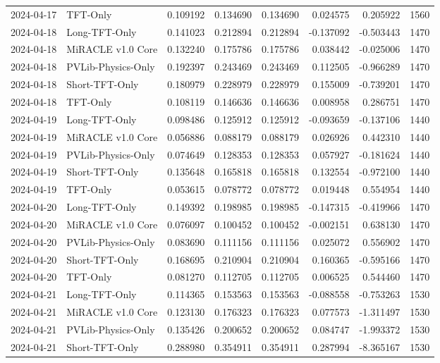 \begin{tabular}{llrrrrrr}
2024-04-17 & TFT-Only & 0.109192 & 0.134690 & 0.134690 & 0.024575 & 0.205922 & 1560 \\
2024-04-18 & Long-TFT-Only & 0.141023 & 0.212894 & 0.212894 & -0.137092 & -0.503443 & 1470 \\
2024-04-18 & MiRACLE v1.0 Core & 0.132240 & 0.175786 & 0.175786 & 0.038442 & -0.025006 & 1470 \\
2024-04-18 & PVLib-Physics-Only & 0.192397 & 0.243469 & 0.243469 & 0.112505 & -0.966289 & 1470 \\
2024-04-18 & Short-TFT-Only & 0.180979 & 0.228979 & 0.228979 & 0.155009 & -0.739201 & 1470 \\
2024-04-18 & TFT-Only & 0.108119 & 0.146636 & 0.146636 & 0.008958 & 0.286751 & 1470 \\
2024-04-19 & Long-TFT-Only & 0.098486 & 0.125912 & 0.125912 & -0.093659 & -0.137106 & 1440 \\
2024-04-19 & MiRACLE v1.0 Core & 0.056886 & 0.088179 & 0.088179 & 0.026926 & 0.442310 & 1440 \\
2024-04-19 & PVLib-Physics-Only & 0.074649 & 0.128353 & 0.128353 & 0.057927 & -0.181624 & 1440 \\
2024-04-19 & Short-TFT-Only & 0.135648 & 0.165818 & 0.165818 & 0.132554 & -0.972100 & 1440 \\
2024-04-19 & TFT-Only & 0.053615 & 0.078772 & 0.078772 & 0.019448 & 0.554954 & 1440 \\
2024-04-20 & Long-TFT-Only & 0.149392 & 0.198985 & 0.198985 & -0.147315 & -0.419966 & 1470 \\
2024-04-20 & MiRACLE v1.0 Core & 0.076097 & 0.100452 & 0.100452 & -0.002151 & 0.638130 & 1470 \\
2024-04-20 & PVLib-Physics-Only & 0.083690 & 0.111156 & 0.111156 & 0.025072 & 0.556902 & 1470 \\
2024-04-20 & Short-TFT-Only & 0.168695 & 0.210904 & 0.210904 & 0.160365 & -0.595166 & 1470 \\
2024-04-20 & TFT-Only & 0.081270 & 0.112705 & 0.112705 & 0.006525 & 0.544460 & 1470 \\
2024-04-21 & Long-TFT-Only & 0.114365 & 0.153563 & 0.153563 & -0.088558 & -0.753263 & 1530 \\
2024-04-21 & MiRACLE v1.0 Core & 0.123130 & 0.176323 & 0.176323 & 0.077573 & -1.311497 & 1530 \\
2024-04-21 & PVLib-Physics-Only & 0.135426 & 0.200652 & 0.200652 & 0.084747 & -1.993372 & 1530 \\
2024-04-21 & Short-TFT-Only & 0.288980 & 0.354911 & 0.354911 & 0.287994 & -8.365167 & 1530 \\

\end{tabular}
